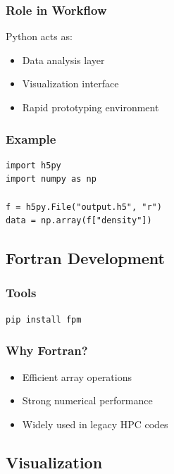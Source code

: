 \subsubsection{Role in Workflow}

Python acts as:

\begin{itemize}
    \item Data analysis layer
    \item Visualization interface
    \item Rapid prototyping environment
\end{itemize}

\subsubsection{Example}

\begin{lstlisting}
import h5py
import numpy as np

f = h5py.File("output.h5", "r")
data = np.array(f["density"])
\end{lstlisting}

\subsection{Fortran Development}

\subsubsection{Tools}

\begin{lstlisting}
pip install fpm
\end{lstlisting}

\subsubsection{Why Fortran?}

\begin{itemize}
    \item Efficient array operations
    \item Strong numerical performance
    \item Widely used in legacy HPC codes
\end{itemize}

\subsection{Visualization}

